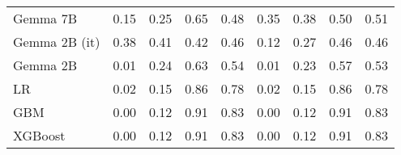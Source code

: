 \begin{tabular}{lllllllll}
Gemma 7B & 0.15 & 0.25 & 0.65 & \cellcolor{orange!4.1} 0.48 & \cellcolor{orange!25.0} 0.35 & \cellcolor{orange!25.0} 0.38 & \cellcolor{orange!1.6} 0.50 & 0.51 \\
Gemma 2B (it) & \cellcolor{orange!25.0} 0.38 & \cellcolor{orange!25.0} 0.41 & \cellcolor{orange!25.0} 0.42 & \cellcolor{orange!16.3} 0.46 & 0.12 & 0.27 & \cellcolor{orange!25.0} 0.46 & \cellcolor{orange!25.0} 0.46 \\
Gemma 2B & \cellcolor{cyan!25.0} 0.01 & 0.24 & 0.63 & 0.54 & \cellcolor{cyan!25.0} 0.01 & 0.23 & 0.57 & 0.53 \\
LR & 0.02 & 0.15 & 0.86 & 0.78 & 0.02 & 0.15 & 0.86 & 0.78 \\
GBM & 0.00 & 0.12 & 0.91 & 0.83 & 0.00 & 0.12 & 0.91 & 0.83 \\
XGBoost & 0.00 & 0.12 & 0.91 & 0.83 & 0.00 & 0.12 & 0.91 & 0.83 \\
\bottomrule
\end{tabular}

